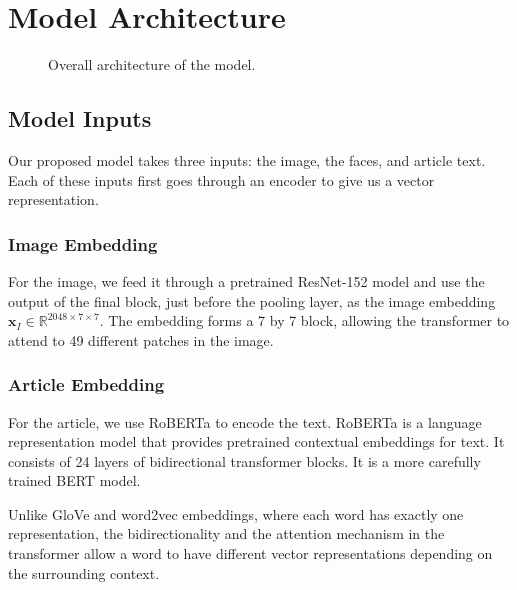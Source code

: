 

\section{Model Architecture}

\begin{figure*}[t]
   \begin{center}
   \fbox{\rule{0pt}{2in} \rule{.9\linewidth}{0pt}}
   \end{center}
      \caption{Overall architecture of the model.}
   \label{fig:short}
\end{figure*}


\subsection{Model Inputs}

Our proposed model takes three inputs: the image, the faces, and article text.
Each of these inputs first goes through an encoder to give us a vector
representation.

\subsubsection{Image Embedding}

For the image, we feed it through a pretrained ResNet-152 model
\cite{He2016ResNet} and use the output of the final block, just before the
pooling layer, as the image embedding $\bm{x}_I \in \mathbb{R}^{2048 \times 7
\times 7}$. The embedding forms a 7 by 7 block, allowing the transformer to
attend to 49 different patches in the image.

\subsubsection{Article Embedding}

For the article, we use RoBERTa \cite{Liu2019RoBERTaAR} to encode the text.
RoBERTa is a language representation model that provides pretrained contextual
embeddings for text. It consists of 24 layers of bidirectional transformer
blocks. It is a more carefully trained BERT \cite{Devlin2019BERT} model.

Unlike GloVe \cite{Pennington2014Glove} and word2vec
\cite{Mikolov2013DistributedRO} embeddings, where each word has exactly one
representation, the bidirectionality and the attention mechanism in the
transformer allow a word to have different vector representations depending on
the surrounding context.

